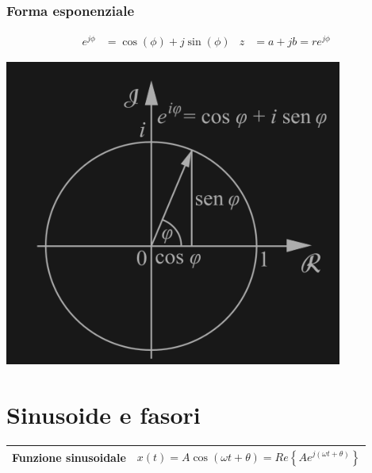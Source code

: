 \documentclass{article}
\begin{document}
\subsubsection*{Forma esponenziale}
\begin{align*}
    e^{j \phi} &= \cos(\phi) + j \sin(\phi) & z&= a + jb = r e^{j \phi} 
\end{align*}
\begin{center}
    \includegraphics[scale=0.5]{Circonferenza.png}
\end{center}




\section{Sinusoide e fasori}
\renewcommand{\arraystretch}{2.5}
\begin{center}
    \begin{tabular}{|c|c|}
        \hline
        Funzione sinusoidale & $x(t) = A \cos (\omega t + \theta) = Re \left\{  A e^{j(\omega t + \theta)}\right\}$\\
        \hline
    \end{tabular} 
\end{center}
\end{document}
